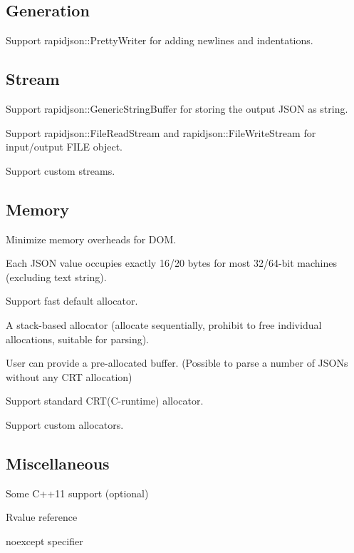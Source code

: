 \subsection*{Generation}


\begin{DoxyItemize}
\item Support {\ttfamily rapidjson\+::\+Pretty\+Writer} for adding newlines and indentations.
\end{DoxyItemize}

\subsection*{Stream}


\begin{DoxyItemize}
\item Support {\ttfamily rapidjson\+::\+Generic\+String\+Buffer} for storing the output J\+S\+ON as string.
\item Support {\ttfamily rapidjson\+::\+File\+Read\+Stream} and {\ttfamily rapidjson\+::\+File\+Write\+Stream} for input/output {\ttfamily F\+I\+LE} object.
\item Support custom streams.
\end{DoxyItemize}

\subsection*{Memory}


\begin{DoxyItemize}
\item Minimize memory overheads for D\+OM.
\begin{DoxyItemize}
\item Each J\+S\+ON value occupies exactly 16/20 bytes for most 32/64-\/bit machines (excluding text string).
\end{DoxyItemize}
\item Support fast default allocator.
\begin{DoxyItemize}
\item A stack-\/based allocator (allocate sequentially, prohibit to free individual allocations, suitable for parsing).
\item User can provide a pre-\/allocated buffer. (Possible to parse a number of J\+S\+O\+Ns without any C\+RT allocation)
\end{DoxyItemize}
\item Support standard C\+RT(C-\/runtime) allocator.
\item Support custom allocators.
\end{DoxyItemize}

\subsection*{Miscellaneous}


\begin{DoxyItemize}
\item Some C++11 support (optional)
\begin{DoxyItemize}
\item Rvalue reference
\item {\ttfamily noexcept} specifier 
\end{DoxyItemize}
\end{DoxyItemize}
